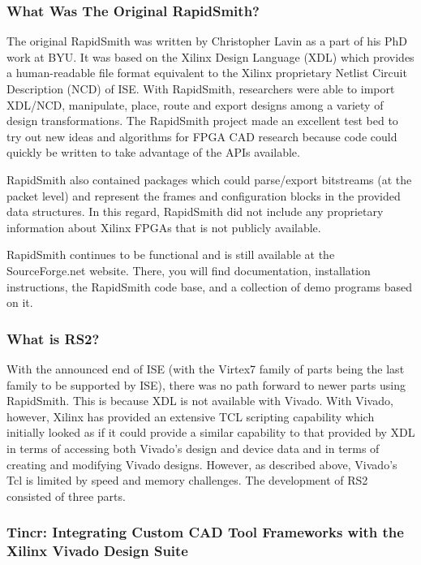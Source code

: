 \documentclass[12pt]{article}
\begin{document}
\subsubsection{What Was The Original RapidSmith?}
The original RapidSmith was written by Christopher Lavin as a part of his PhD
work at BYU.  It was based on the Xilinx Design Language (XDL) which provides a
human-readable file format equivalent to the Xilinx proprietary Netlist Circuit
Description (NCD) of ISE.  With RapidSmith, researchers were able to import
XDL/NCD, manipulate, place, route and export designs among a variety of design
transformations.  The RapidSmith project made an excellent test bed to try out
new ideas and algorithms for FPGA CAD research because code could quickly be
written to take advantage of the APIs available.

RapidSmith also contained packages which could parse/export bitstreams (at the
packet level) and represent the frames and configuration blocks in the provided
data structures.  In this regard, RapidSmith did not include any proprietary
information about Xilinx FPGAs that is not publicly available.

RapidSmith continues to be functional and is still available at the
SourceForge.net website.  There, you will find documentation, installation
instructions, the RapidSmith code base, and a collection of demo programs based
on it.

\subsubsection{What is RS2?}
With the announced end of ISE (with the Virtex7 family of parts being the last
family to be supported by ISE), there was no path forward to newer parts using
RapidSmith.  This is because XDL is not available with Vivado. With
Vivado, however, Xilinx has provided an extensive TCL scripting capability which 
initially looked as if it could provide a similar capability to that provided by
XDL in terms of accessing both Vivado's design and device data and in terms of
creating and modifying Vivado designs.  However, as described above, Vivado's
Tcl is limited by speed and memory challenges.
The development of RS2 consisted of three parts.

\subsubsection{Tincr: Integrating Custom CAD Tool Frameworks with the Xilinx 
Vivado Design Suite} 
\end{document}
